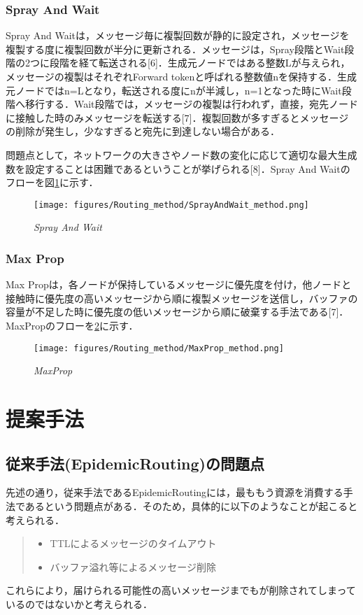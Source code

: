 \documentclass[11pt]{icsthesis}
\begin{document}
\subsection{Spray And Wait}
Spray And Waitは，メッセージ毎に複製回数が静的に設定され，メッセージを複製する度に複製回数が半分に更新される．メッセージは，Spray段階とWait段階の2つに段階を経て転送される[6]．生成元ノードではある整数Lが与えられ，メッセージの複製はそれぞれForward tokenと呼ばれる整数値nを保持する．生成元ノードではn=Lとなり，転送される度にnが半減し，n=1となった時にWait段階へ移行する．Wait段階では，メッセージの複製は行われず，直接，宛先ノードに接触した時のみメッセージを転送する[7]．複製回数が多すぎるとメッセージの削除が発生し，少なすぎると宛先に到達しない場合がある．

問題点として，ネットワークの大きさやノード数の変化に応じて適切な最大生成数を設定することは困難であるということが挙げられる[8]．Spray And Waitのフローを図\ref{SprayAndWait}に示す．

\begin{figure}[h]
	\centering
	\texttt{[image: figures/Routing\_method/SprayAndWait\_method.png]}
	\caption[]{\it{Spray And Wait}}
	\label{SprayAndWait}
\end{figure}

\newpage

\subsection{Max Prop}
Max Propは，各ノードが保持しているメッセージに優先度を付け，他ノードと接触時に優先度の高いメッセージから順に複製メッセージを送信し，バッファの容量が不足した時に優先度の低いメッセージから順に破棄する手法である[7]．MaxPropのフローを\ref{MaxProp}に示す．

\begin{figure}[h]
	\centering
	\texttt{[image: figures/Routing\_method/MaxProp\_method.png]}
	\caption[]{\it{MaxProp}}
	\label{MaxProp}
\end{figure}

\chapter{提案手法}
\section{従来手法(EpidemicRouting)の問題点}
先述の通り，従来手法であるEpidemicRoutingには，最ももう資源を消費する手法であるという問題点がある．そのため，具体的に以下のようなことが起こると考えられる．
\begin{quote}
\begin{itemize}
\item TTLによるメッセージのタイムアウト
\item バッファ溢れ等によるメッセージ削除
\end{itemize}
\end{quote}
これらにより，届けられる可能性の高いメッセージまでもが削除されてしまっているのではないかと考えられる．
\end{document}

